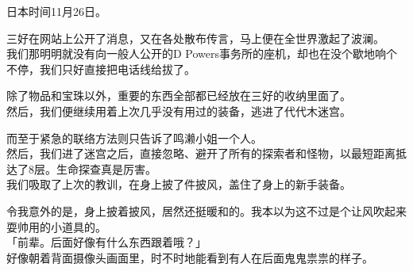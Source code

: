 日本时间11月26日。

三好在网站上公开了消息，又在各处散布传言，马上便在全世界激起了波澜。\\

我们那明明就没有向一般人公开的D Powers事务所的座机，却也在没个歇地响个不停，我们只好直接把电话线给拔了。

除了物品和宝珠以外，重要的东西全部都已经放在三好的收纳里面了。\\

然后，我们便继续用着上次几乎没有用过的装备，逃进了代代木迷宫。

而至于紧急的联络方法则只告诉了鸣濑小姐一个人。\\

然后，我们进了迷宫之后，直接忽略、避开了所有的探索者和怪物，以最短距离抵达了8层。生命探查真是厉害。\\

我们吸取了上次的教训，在身上披了件披风，盖住了身上的新手装备。

令我意外的是，身上披着披风，居然还挺暖和的。我本以为这不过是个让风吹起来耍帅用的小道具的。\\

「前辈。后面好像有什么东西跟着哦？」\\

好像朝着背面摄像头画面里，时不时地能看到有人在后面鬼鬼祟祟的样子。\\

